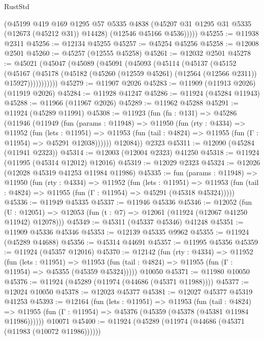 \begin{lexlean}{RustStd}
\begin{coremodule}
{\begin{coremodule}
{{{{{{{{{{{{{{{{{{{{{{{{{{{{{{{{{{{{{{{{{{{{{{{{{{{{{{{{{{{{{{{{{{{{{{{{{{{{{{{{          (@45199
            @419
            @169
            @1295
            @57
            @5335
            @4838
            (@45207 @31 @1295 @31 @5335 (@12673 (@45212 @31)) @14428)
            (@12546 @45166 @4536)))))
@45255 := @11938 @2311
@45256 := @12134 @45255
@45257 := @45254 @45256
@45258 := @12008 @2501
@45260 := @45257 (@12555 @45258)
@45261 := @12032 @2501
@45278 := @45021
    (@45047
      (@45089
        (@45091
          (@45093
            (@45114
              (@45137
                (@45152
                  (@45167
                    (@45178
                      (@45182 (@45260 (@12559 @45261) (@12564 (@12566 @2311)) @15927)))))))))))
@45279 := @11907 @2026
@45283 := @11909 (@11913 @2026) (@11919 @2026)
@45284 := @11928 @41247
@45286 := @11924 (@45284 @11943)
@45288 := @11966 (@11967 @2026)
@45289 := @11962 @45288
@45291 := @11924 (@45289 @11991)
@45308 := @11923
    (fun (fn : @131) =>
    @45286
      (@11946
        (@11949
          (fun (params : @11948) =>
          @11950
            (fun (rty : @4334) =>
            @11952
              (fun (lets : @11951) =>
              @11953 (fun (tail : @4824) => @11955 (fun (Γ : @11954) => @45291 @12038))))))
        @12084))
    @2323
@45311 := @12090 (@45284 (@11941 @2323))
@45314 := @12003 (@12004 @2323) @41250
@45318 := @11924 (@11995 (@45314 @12012) @12016)
@45319 := @12029 @2323
@45324 := @12026 (@12028 @45319 @41253 @11984 @11986)
@45335 := fun (params : @11948) =>
  @11950
    (fun (rty : @4334) =>
    @11952
      (fun (lets : @11951) =>
      @11953 (fun (tail : @4824) => @11955 (fun (Γ : @11954) => @45291 (@45318 @45324)))))
@45336 := @11949 @45335
@45337 := @11946 @45336
@45346 := @12052
    (fun (U : @12051) => @12053 (fun (t : @7) => @12061 (@11924 (@12067 @41250 @11942) @12078)))
@45349 := @45311 (@45337 @45346) @41248
@45351 := @11909 @45336 @45346
@45353 := @12139 @45335 @9962
@45355 := @11924 (@45289 @44688)
@45356 := @45314 @44691
@45357 := @11995 @45356
@45359 := @11924 (@45357 @12016)
@45370 := @12142
    (fun (rty : @4334) =>
    @11952
      (fun (lets : @11951) =>
      @11953 (fun (tail : @4824) => @11955 (fun (Γ : @11954) => @45355 (@45359 @45324)))))
    @10050
@45371 := @11980 @10050
@45376 := @11924 (@45289 (@11974 (@44686 (@45371 @11988))))
@45377 := @12024 @10050
@45378 := @12023 @45377
@45381 := @12027 @45377 @45319 @41253
@45393 := @12164
    (fun (lets : @11951) =>
    @11953
      (fun (tail : @4824) =>
      @11955 (fun (Γ : @11954) => @45376 (@45359 (@45378 (@45381 @11984 @11986))))))
    @10071
@45400 := @11924 (@45289 (@11974 (@44686 (@45371 (@11983 (@10072 @11986))))))
}}}}}}}}}}}}}}}}}}}}}}}}}}}}}}}}}}}}}}}}}}}}}}}}}}}}}}}}}}}}}}}}}}}}}}}}}}}}}}}}
\end{coremodule}}
\end{coremodule}
\end{lexlean}

